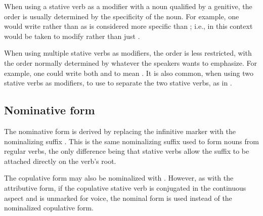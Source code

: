 When using a stative verb as a modifier with a noun qualified by a genitive, the
order is usually determined by the specificity of the noun. For example, one
would write  rather than
 as  is considered more specific than
; i.e., in this context  would be taken to modify
 rather than just .

When using multiple stative verbs as modifiers, the order is less restricted,
with the order normally determined by whatever the speakers wants to emphasize.
For example, one could write both  and  to mean . It is also common, when using two
stative verbs as modifiers, to use  to separate the two stative
verbs, as in .

\subsection{Nominative form}
The nominative form is derived by replacing the infinitive marker  with
the nominalizing suffix . This is the same nominalizing suffix used to
form nouns from regular verbs, the only difference being that stative verbs
allow the suffix to be attached directly on the verb's root.

The copulative form may also be nominalized with .
 However, as with the attributive form, if the copulative
stative verb is conjugated in the continuous aspect and is unmarked for voice,
the nominal form is used instead of the nominalized copulative form.